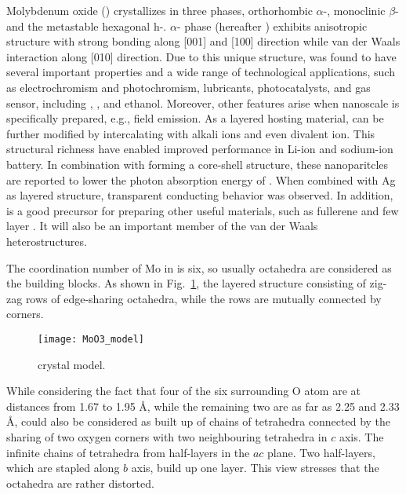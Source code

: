 Molybdenum oxide () crystallizes in three phases, orthorhombic $\alpha$-, monoclinic $\beta$- and the metastable hexagonal h-.\citep{Deb1968,Fibers2007} $\alpha$- phase (hereafter ) exhibits anisotropic structure with strong bonding along [001] and [100] direction while van der Waals interaction along [010] direction.\cite{He2003} Due to this unique structure,  was found to have several important properties and a wide range of technological applications, such as electrochromism and photochromism,\cite{Yao1992} lubricants,\cite{Sheehan1996} photocatalysts,\cite{Chen2010} and gas sensor, including ,\cite{Comini2005} ,\cite{Taurino2006} \cite{Sha2009} and ethanol.\cite{Choopun} Moreover, other features arise when nanoscale  is specifically prepared, e.g., field emission.\citep{Li2002d,Zhou2003b}  As a layered hosting material,  can be further modified by intercalating with alkali ions\citep{Spahr1995,Li2006b,Hu2011} and even divalent ion.\cite{Sian2005} This structural richness have enabled improved performance in Li-ion\cite{Mai2007} and sodium-ion battery.\cite{Hariharan2013} In combination with  forming a core-shell structure, these nanoparitcles are reported to lower the photon absorption energy of .\cite{Elder2000} When combined with Ag as layered structure, transparent conducting behavior was observed.\cite{Nguyen2012} In addition,  is a good precursor for preparing other useful materials, such as  fullerene\cite{Li2003c} and few layer .\cite{Lin2012} It will also be an important member of the van der Waals heterostructures.\cite{Geim2013}

The coordination number of Mo in  is six, so usually  octahedra are considered as the building blocks. As shown in Fig.~\ref{fig:mo3model}, the layered structure consisting of zig-zag rows of edge-sharing  octahedra, while the rows are mutually connected by corners.
\begin{figure}[ht]
\centering
\texttt{[image: MoO3\_model]}
\caption[ crystal model]{ crystal model.}
\label{fig:mo3model}
\end{figure}
While considering the fact that four of the six surrounding O atom are at distances from 1.67 to 1.95 \AA, while the remaining two are as far as 2.25 and 2.33 \AA,  could also be considered as built up of chains of  tetrahedra connected by the sharing of two oxygen corners with two neighbouring tetrahedra in $c$ axis. The infinite chains of  tetrahedra from half-layers in the $ac$ plane. Two half-layers, which are stapled along $b$ axis, build up one  layer.\cite{Itoh2001a} This view stresses that the  octahedra are rather distorted.

